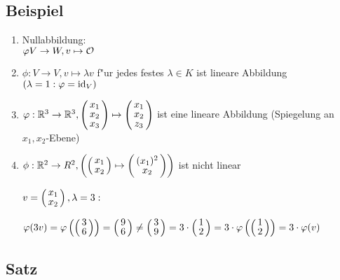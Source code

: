 \subsection{Beispiel}
\begin{enumerate}
	\item
	Nullabbildung:\\
	$\varphi V \rightarrow W, v \mapsto \mathcal{O}$
	\item
	$\phi : V \rightarrow V, v \mapsto \lambda v$ f"ur jedes festes $\lambda \in K$ ist lineare Abbildung $(\lambda = 1: \varphi = \mathrm{ id }_V )$
	\item
	$\varphi : \R^3 \rightarrow \R^3, \vct{x_1\\ x_2\\ x_3}\mapsto \vct{x_1 \\ x_2 \\ z_3}$ ist eine lineare Abbildung (Spiegelung an $x_1, x_2$-Ebene) 
	\item
	$\phi : \R^ 2 \rightarrow R^2, \left(	\vct{x_1 \\ x_2} \mapsto \vct{(x_1)^2 \\ x_2 }\right)$ ist nicht linear
	
	$v= \vct{x_1 \\ x_2}, \lambda =3:$
	
	 $\varphi(3v)= \varphi\left(\vct{3 \\ 6}\right)=  \vct{9 \\ 6} \neq \vct{3 \\ 9} = 3 \cdot \vct{1\\2}= 3 \cdot \varphi \left(\vct{1\\2} \right) = 3 \cdot \varphi(v)$
	 \\

\end{enumerate}
\subsection{Satz}
\subsection{}
\subsection{}
\subsection{}
\subsection{}